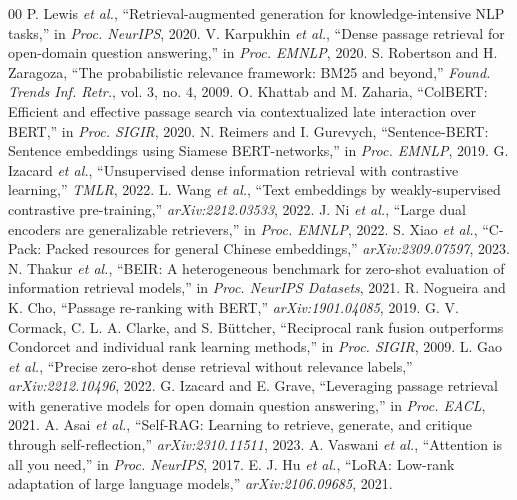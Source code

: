 \documentclass[conference]{IEEEtran}
\begin{document}
\begin{thebibliography}{00}
 P. Lewis \textit{et al.}, ``Retrieval-augmented generation for knowledge-intensive NLP tasks,'' in \textit{Proc. NeurIPS}, 2020.
 V. Karpukhin \textit{et al.}, ``Dense passage retrieval for open-domain question answering,'' in \textit{Proc. EMNLP}, 2020.
 S. Robertson and H. Zaragoza, ``The probabilistic relevance framework: BM25 and beyond,'' \textit{Found. Trends Inf. Retr.}, vol. 3, no. 4, 2009.
 O. Khattab and M. Zaharia, ``ColBERT: Efficient and effective passage search via contextualized late interaction over BERT,'' in \textit{Proc. SIGIR}, 2020.
 N. Reimers and I. Gurevych, ``Sentence-BERT: Sentence embeddings using Siamese BERT-networks,'' in \textit{Proc. EMNLP}, 2019.
 G. Izacard \textit{et al.}, ``Unsupervised dense information retrieval with contrastive learning,'' \textit{TMLR}, 2022.
 L. Wang \textit{et al.}, ``Text embeddings by weakly-supervised contrastive pre-training,'' \textit{arXiv:2212.03533}, 2022.
 J. Ni \textit{et al.}, ``Large dual encoders are generalizable retrievers,'' in \textit{Proc. EMNLP}, 2022.
 S. Xiao \textit{et al.}, ``C-Pack: Packed resources for general Chinese embeddings,'' \textit{arXiv:2309.07597}, 2023.
 N. Thakur \textit{et al.}, ``BEIR: A heterogeneous benchmark for zero-shot evaluation of information retrieval models,'' in \textit{Proc. NeurIPS Datasets}, 2021.
 R. Nogueira and K. Cho, ``Passage re-ranking with BERT,'' \textit{arXiv:1901.04085}, 2019.
 G. V. Cormack, C. L. A. Clarke, and S. B\"uttcher, ``Reciprocal rank fusion outperforms Condorcet and individual rank learning methods,'' in \textit{Proc. SIGIR}, 2009.
 L. Gao \textit{et al.}, ``Precise zero-shot dense retrieval without relevance labels,'' \textit{arXiv:2212.10496}, 2022.
 G. Izacard and E. Grave, ``Leveraging passage retrieval with generative models for open domain question answering,'' in \textit{Proc. EACL}, 2021.
 A. Asai \textit{et al.}, ``Self-RAG: Learning to retrieve, generate, and critique through self-reflection,'' \textit{arXiv:2310.11511}, 2023.
 A. Vaswani \textit{et al.}, ``Attention is all you need,'' in \textit{Proc. NeurIPS}, 2017.
 E. J. Hu \textit{et al.}, ``LoRA: Low-rank adaptation of large language models,'' \textit{arXiv:2106.09685}, 2021.

\end{thebibliography}
\end{document}
